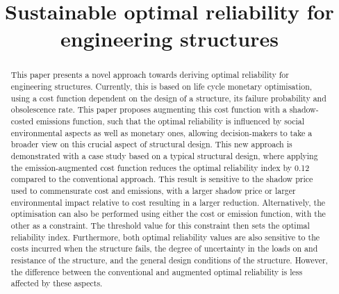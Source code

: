 \documentclass[]{interact}
\theoremstyle{plain}%
\theoremstyle{definition}
\theoremstyle{remark}
\begin{document}
\title{Sustainable optimal reliability for engineering structures}

\author{
}


\maketitle

\begin{abstract}

This paper presents a novel approach towards deriving optimal reliability for engineering structures.
Currently, this is based on life cycle monetary optimisation, using a cost function dependent on the design of a structure, its failure probability and obsolescence rate.
This paper proposes augmenting this cost function with a shadow-costed emissions function, such that the optimal reliability is influenced by social environmental aspects as well as monetary ones, allowing decision-makers to take a broader view on this crucial aspect of structural design.
This new approach is demonstrated with a case study based on a typical structural design, where applying the emission-augmented cost function reduces the optimal reliability index by 0.12 compared to the conventional approach.
This result is sensitive to the shadow price used to commensurate cost and emissions, with a larger shadow price or larger environmental impact relative to cost resulting in a larger reduction.
Alternatively, the optimisation can also be performed using either the cost or emission function, with the other as a constraint.
The threshold value for this constraint then sets the optimal reliability index.
Furthermore, both optimal reliability values are also sensitive to the costs incurred when the structure fails, the degree of uncertainty in the loads on and resistance of the structure, and the general design conditions of the structure.
However, the difference between the conventional and augmented optimal reliability is less affected by these aspects.




\end{abstract}
\end{document}
